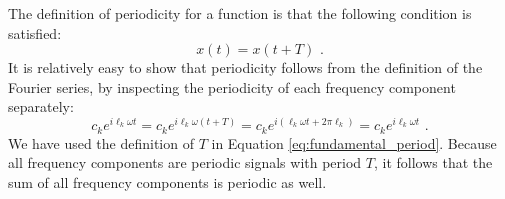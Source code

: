 The definition of periodicity for a function is that the following condition is satisfied:
\begin{equation}
  \boxed{
    x(t) = x(t+T)
  } \,\,.
\end{equation}
It is relatively easy to show that periodicity follows from the
definition of the Fourier series, by inspecting the periodicity of
each frequency component separately:
\begin{equation}
  c_k e^{i \ell_k \omega t} = c_k e^{i \ell_k \omega (t+T)} = c_k e^{i (\ell_k \omega t+ 2\pi \ell_k )} = c_k e^{i \ell_k \omega t} \,\,.
\end{equation}
We have used the definition of $T$ in
Equation \ref{eq:fundamental_period}. Because all frequency components
are periodic signals with period $T$, it follows that the sum of all
frequency components is periodic as well.

\begin{marginfigure}[0cm]
  \begin{center}
  \end{center}
  \caption{Periodic function $e^{i9t} - e^{i15t}$.
  Blue denotes the real and red denotes the imaginary component of the signal.}
  \label{fig:ex_periodic}
\end{marginfigure}

